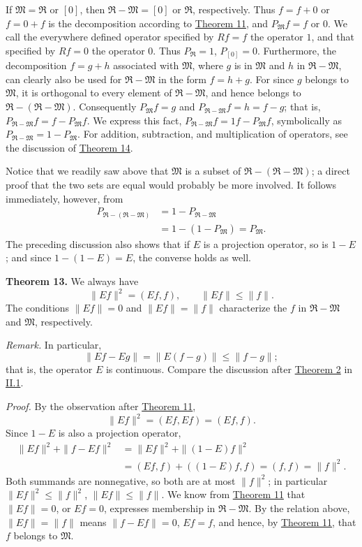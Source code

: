 \documentclass[fontsize=13pt,twoside,openany,headings=normal,parskip=false,bookmarkpackage=false,DIV=calc]{scrbook}
\begin{document}
If $\mathfrak{M}=\mathfrak{R}$ or $[0]$, then $\mathfrak{R}-\mathfrak{M}=[0]$ or $\mathfrak{R}$, respectively. Thus $f=f+0$ or $f=0+f$ is the decomposition according to \hyperref[thm:II.11]{Theorem 11}, and $P_{\mathfrak{M}}f=f$ or $0$. We call the everywhere defined operator specified by $Rf=f$ the operator $1$, and that specified by $Rf=0$ the operator $0$. Thus $P_{\mathfrak{R}}=1$, $P_{[0]}=0$. Furthermore, the decomposition $f=g+h$ associated with $\mathfrak{M}$, where $g$ is in $\mathfrak{M}$ and $h$ in $\mathfrak{R}-\mathfrak{M}$, can clearly also be used for $\mathfrak{R}-\mathfrak{M}$ in the form $f=h+g$. For since $g$ belongs to $\mathfrak{M}$, it is orthogonal to every element of $\mathfrak{R}-\mathfrak{M}$, and hence belongs to $\mathfrak{R}-(\mathfrak{R}-\mathfrak{M})$. Consequently $P_{\mathfrak{M}}f=g$ and $P_{\mathfrak{R}-\mathfrak{M}}f=h=f-g$; that is, $P_{\mathfrak{R}-\mathfrak{M}}f=f-P_{\mathfrak{M}}f$. We express this fact, $P_{\mathfrak{R}-\mathfrak{M}}f=1f-P_{\mathfrak{M}}f$, symbolically as $P_{\mathfrak{R}-\mathfrak{M}}=1-P_{\mathfrak{M}}$. For addition, subtraction, and multiplication of operators, see the discussion of \hyperref[thm:II.14]{Theorem 14}.

\hypertarget{origpage-42}{}%
Notice that we readily saw above that $\mathfrak{M}$ is a subset of $\mathfrak{R}-(\mathfrak{R}-\mathfrak{M})$; a direct proof that the two sets are equal would probably be more involved. It follows immediately, however, from
\begin{align*}
P_{\mathfrak{R}-(\mathfrak{R}-\mathfrak{M})}&=1-P_{\mathfrak{R}-\mathfrak{M}}\\
&=1-(1-P_{\mathfrak{M}})=P_{\mathfrak{M}}.
\end{align*}
The preceding discussion also shows that if $E$ is a projection operator, so is $1-E$; and since $1-(1-E)=E$, the converse holds as well.

\leavevmode{}\textbf{Theorem 13.}\label{thm:II.13} We always have
\[
\|Ef\|^2=(Ef,f),\qquad\|Ef\|\leq\|f\|.
\]
The conditions $\|Ef\|=0$ and $\|Ef\|=\|f\|$ characterize the $f$ in $\mathfrak{R}-\mathfrak{M}$ and $\mathfrak{M}$, respectively.

\emph{Remark.} In particular,
\[
\|Ef-Eg\|=\|E(f-g)\|\leq\|f-g\|;
\]
that is, the operator $E$ is continuous. Compare the discussion after \hyperref[thm:II.2]{Theorem 2} in \hyperref[sec:II.1]{II.1}.

\emph{Proof.} By the observation after \hyperref[thm:II.11]{Theorem 11},
\[
\|Ef\|^2=(Ef,Ef)=(Ef,f).
\]
Since $1-E$ is also a projection operator,
\begin{align*}
\|Ef\|^2+\|f-Ef\|^2&=\|Ef\|^2+\|(1-E)f\|^2\\
&=(Ef,f)+((1-E)f,f)=(f,f)=\|f\|^2.
\end{align*}
Both summands are nonnegative, so both are at most $\|f\|^2$; in particular $\|Ef\|^2\leq\|f\|^2$, $\|Ef\|\leq\|f\|$. We know from \hyperref[thm:II.11]{Theorem 11} that $\|Ef\|=0$, or $Ef=0$, expresses membership in $\mathfrak{R}-\mathfrak{M}$. By the relation above, $\|Ef\|=\|f\|$ means $\|f-Ef\|=0$, $Ef=f$, and hence, by \hyperref[thm:II.11]{Theorem 11}, that $f$ belongs to $\mathfrak{M}$.
\end{document}

